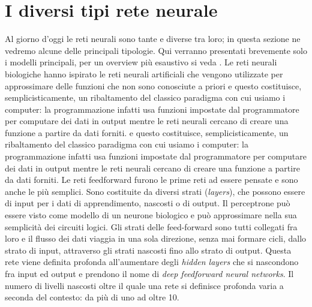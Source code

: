 \section{I diversi tipi rete neurale}
Al giorno d'oggi le reti neurali sono tante e diverse tra loro; in questa sezione ne vedremo alcune delle principali tipologie. Qui verranno presentati brevemente solo i modelli principali, per un overview più esaustivo si veda \cite{networks_zoo}.
Le reti neurali biologiche hanno ispirato le reti neurali artificiali che vengono utilizzate per approssimare delle funzioni che non sono conosciute a priori \cite{wiki:tipi} e questo costituisce, semplicisticamente, un ribaltamento del classico paradigma con cui usiamo i computer: la programmazione infatti usa funzioni impostate dal programmatore per computare dei dati in output mentre le reti neurali cercano di creare una funzione a partire da dati forniti.
e questo costituisce, semplicisticamente, un ribaltamento del classico paradigma con cui usiamo i computer: la programmazione infatti usa funzioni impostate dal programmatore per computare dei dati in output mentre le reti neurali cercano di creare una funzione a partire da dati forniti.
Le reti feedforward furono le prime reti ad essere pensate e sono anche le più semplici. Sono costituite da diversi strati (\textit{layers}), che possono essere di input per i dati di apprendimento, nascosti o di output.
Il perceptrone può essere visto come modello di un neurone biologico e può approssimare nella sua semplicità dei circuiti logici. Gli strati delle feed-forward sono tutti collegati fra loro e il flusso dei dati viaggia in una sola direzione, senza mai formare cicli, dallo strato di input, attraverso gli strati nascosti fino allo strato di output. Questa rete viene definita profonda all'aumentare degli \textit{hidden layers} che si nascondono fra input ed output e prendono il nome di \textit{deep feedforward neural networks}. Il numero di livelli nascosti oltre il quale una rete si definisce profonda varia a seconda del contesto: da più di uno ad oltre 10.



